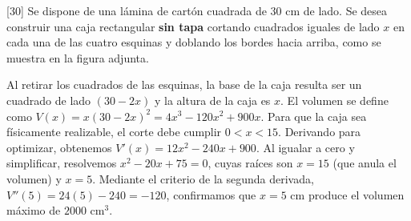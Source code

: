 \documentclass[11pt,paper=a4,answers, addpoints]{exam}
\begin{document}
\begin{questions}

[30]
Se dispone de una lámina de cartón cuadrada de $30 \text{ cm}$ de lado. Se desea construir una caja rectangular \textbf{sin tapa} cortando cuadrados iguales de lado $x$ en cada una de las cuatro esquinas y doblando los bordes hacia arriba, como se muestra en la figura adjunta.

\begin{center}
\end{center}

\begin{solution}
Al retirar los cuadrados de las esquinas, la base de la caja resulta ser un cuadrado de lado $(30-2x)$ y la altura de la caja es $x$. El volumen se define como $V(x) = x(30-2x)^2 = 4x^3 - 120x^2 + 900x$. Para que la caja sea físicamente realizable, el corte debe cumplir $0 < x < 15$. Derivando para optimizar, obtenemos $V'(x) = 12x^2 - 240x + 900$. Al igualar a cero y simplificar, resolvemos $x^2 - 20x + 75 = 0$, cuyas raíces son $x = 15$ (que anula el volumen) y $x = 5$. Mediante el criterio de la segunda derivada, $V''(5) = 24(5) - 240 = -120$, confirmamos que $x=5 \text{ cm}$ produce el volumen máximo de $2000 \text{ cm}^3$.
\end{solution}


\end{questions}
\end{document}
